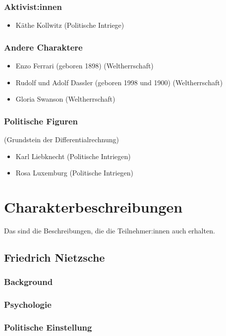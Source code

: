 \documentclass[12pt, a4paper, openany]{report}
\begin{document}
\subsubsection{Aktivist:innen}
\begin{itemize}
	\item Käthe Kollwitz (Politische Intriege)
\end{itemize}

\subsubsection{Andere Charaktere}
\begin{itemize}
	\item Enzo Ferrari (geboren 1898) (Weltherrschaft)
	\item Rudolf und Adolf Dassler (geboren 1998 und 1900) (Weltherrschaft)
	\item Gloria Swanson (Weltherrschaft)
\end{itemize}

\subsubsection{Politische Figuren}(Grundstein der Differentialrechnung)
\begin{itemize}
	\item Karl Liebknecht (Politische Intriegen)
	\item Rosa Luxemburg (Politische Intriegen)
\end{itemize}

\section{Charakterbeschreibungen}
Das sind die Beschreibungen, die die Teilnehmer:innen auch erhalten.

\subsection{Friedrich Nietzsche}
\subsubsection{Background}
\subsubsection{Psychologie}
\subsubsection{Politische Einstellung}
\end{document}
